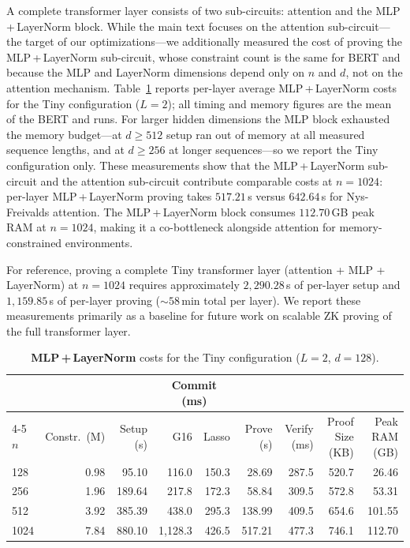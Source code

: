 \documentclass[sigconf,anonymous,review,balance=false]{acmart}
\newcommand{\rev}[1]{{\color{magenta}#1}}
\begin{document}
A complete transformer layer consists of two sub-circuits: attention and the MLP\,+\,LayerNorm block. While the main text focuses on the attention sub-circuit---the target of our \rev{\name} optimizations---we additionally measured the cost of proving the MLP\,+\,LayerNorm sub-circuit, whose constraint count is the same for BERT and \nystromformer because the MLP and LayerNorm dimensions depend only on $n$ and $d$, not on the attention mechanism.
Table~\ref{tab:mlp-costs} reports per-layer average MLP\,+\,LayerNorm costs for the Tiny configuration ($L{=}2$); all timing and memory figures are the mean of the BERT and \nystrom runs.
\rev{For larger hidden dimensions the MLP block exhausted the memory budget---at $d{\geq}512$ setup ran out of memory at all measured sequence lengths, and at $d{\geq}256$ at longer sequences---so we report the Tiny configuration only.}
These measurements show that the MLP\,+\,LayerNorm sub-circuit and the attention sub-circuit contribute comparable costs at $n{=}1024$: per-layer MLP\,+\,LayerNorm proving takes \rev{$517.21$}\,s versus \rev{$642.64$}\,s for \rev{Nys-Freivalds} attention. The MLP\,+\,LayerNorm block consumes \rev{$112.70$}\,GB peak RAM at $n{=}1024$, making it a co-bottleneck alongside attention for memory-constrained environments.

For reference, proving a complete Tiny transformer layer (attention + MLP + LayerNorm) at $n{=}1024$ requires approximately \rev{$2{,}290.28$}\,s of per-layer setup and \rev{$1{,}159.85$}\,s of per-layer proving (\rev{${\sim}58$}\,min total per layer). We report these measurements primarily as a baseline for future work on scalable ZK proving of the full transformer layer.

\begin{table}[!ht]
\centering
\caption{\textbf{MLP\,+\,LayerNorm} costs for the Tiny configuration ($L{=}2$, $d{=}128$).}
\label{tab:mlp-costs}
\small
\setlength{\tabcolsep}{4pt}
\begin{tabular}{@{} l rrrrrrrr @{}}
\toprule
& & & \multicolumn{2}{c}{Commit (ms)} & & & & \\
\cmidrule(lr){4-5}
$n$ & Constr.\ (M) & Setup (s) & G16 & Lasso & Prove (s) & Verify (ms) & Proof Size (KB) & Peak RAM (GB) \\
\midrule
128  & 0.98  & 95.10  & 116.0 & 150.3 & 28.69  & 287.5 & 520.7      & 26.46 \\
256  & 1.96  & 189.64 & 217.8 & 172.3 & 58.84  & 309.5 & 572.8      & 53.31 \\
512  & 3.92  & 385.39 & 438.0 & 295.3 & 138.99 & 409.5 & 654.6      & 101.55 \\
1024 & 7.84  & 880.10 & 1{,}128.3 & 426.5 & 517.21 & 477.3 & 746.1     & 112.70 \\
\bottomrule
\end{tabular}
\end{table}
\end{document}
